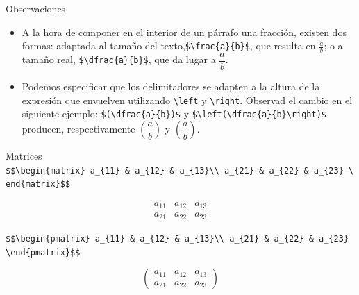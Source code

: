 \documentclass[
  ignorenonframetext,
  aspectratio=169]{beamer}
\begin{document}
\begin{frame}[fragile]{Observaciones}
\protect\hypertarget{observaciones}{}
\begin{itemize}
\item
  A la hora de componer en el interior de un párrafo una fracción,
  existen dos formas: adaptada al tamaño del
  texto,\texttt{\$\textbackslash{}frac\{a\}\{b\}\$}, que resulta en
  \(\frac{a}{b}\); o a tamaño real,
  \texttt{\$\textbackslash{}dfrac\{a\}\{b\}\$}, que da lugar a
  \(\dfrac{a}{b}\).
\item
  Podemos especificar que los delimitadores se adapten a la altura de la
  expresión que envuelven utilizando \texttt{\textbackslash{}left} y
  \texttt{\textbackslash{}right}. Observad el cambio en el siguiente
  ejemplo: \texttt{\$(\textbackslash{}dfrac\{a\}\{b\})\$} y
  \texttt{\$\textbackslash{}left(\textbackslash{}dfrac\{a\}\{b\}\textbackslash{}right)\$}
  producen, respectivamente \((\dfrac{a}{b})\) y
  \(\left(\dfrac{a}{b}\right)\).
\end{itemize}
\end{frame}

\begin{frame}[fragile]{Matrices}
\protect\hypertarget{matrices}{}
\texttt{\$\$\textbackslash{}begin\{matrix\}\ a\_\{11\}\ \&\ a\_\{12\}\ \&\ a\_\{13\}\textbackslash{}\textbackslash{}\ a\_\{21\}\ \&\ a\_\{22\}\ \&\ a\_\{23\}\ \textbackslash{}end\{matrix\}\$\$}

\[\begin{matrix}
a_{11} & a_{12} & a_{13}\\
a_{21} & a_{22} & a_{23}
\end{matrix}\]

\texttt{\$\$\textbackslash{}begin\{pmatrix\}\ a\_\{11\}\ \&\ a\_\{12\}\ \&\ a\_\{13\}\textbackslash{}\textbackslash{}\ a\_\{21\}\ \&\ a\_\{22\}\ \&\ a\_\{23\}\ \textbackslash{}end\{pmatrix\}\$\$}

\[\begin{pmatrix}
a_{11} & a_{12} & a_{13}\\
a_{21} & a_{22} & a_{23}
\end{pmatrix}\]
\end{frame}
\end{document}

